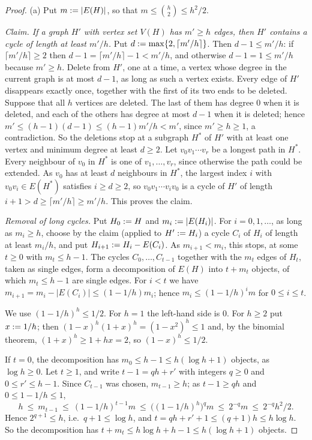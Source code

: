 \begin{proof}
(a) Put $m\mathrel{:=}|E(H)|$, so that $m\le\binom h2\le h^2/2$.

\emph{Claim. If a graph $H'$ with vertex set $V(H)$ has $m'\ge h$ edges, then
$H'$ contains a cycle of length at least $m'/h$.} Put
$d\mathrel{:=}\max\{2,\lceil m'/h\rceil\}$. Then $d-1\le m'/h$: if
$\lceil m'/h\rceil\ge2$ then $d-1=\lceil m'/h\rceil-1<m'/h$, and otherwise
$d-1=1\le m'/h$ because $m'\ge h$. Delete from $H'$, one at a time, a vertex
whose degree in the current graph is at most $d-1$, as long as such a vertex
exists. Every edge of $H'$ disappears exactly once, together with the first of
its two ends to be deleted. Suppose that all $h$ vertices are deleted. The last
of them has degree $0$ when it is deleted, and each of the others has degree at
most $d-1$ when it is deleted; hence $m'\le(h-1)(d-1)\le(h-1)m'/h<m'$, since
$m'\ge h\ge1$, a contradiction. So the deletions stop at a subgraph $H^*$ of $H'$
with at least one vertex and minimum degree at least $d\ge2$. Let
$v_0v_1\cdots v_r$ be a longest path in $H^*$. Every neighbour of $v_0$ in $H^*$
is one of $v_1,\dots,v_r$, since otherwise the path could be extended. As $v_0$
has at least $d$ neighbours in $H^*$, the largest index $i$ with
$v_0v_i\in E(H^*)$ satisfies $i\ge d\ge2$, so $v_0v_1\cdots v_iv_0$ is a cycle of
$H'$ of length $i+1>d\ge\lceil m'/h\rceil\ge m'/h$. This proves the claim.

\emph{Removal of long cycles.} Put $H_0\mathrel{:=} H$ and $m_i\mathrel{:=}|E(H_i)|$. For
$i=0,1,\dots$, as long as $m_i\ge h$, choose by the claim (applied to
$H'\mathrel{:=} H_i$) a cycle $C_i$ of $H_i$ of length at least $m_i/h$, and put
$H_{i+1}\mathrel{:=} H_i-E(C_i)$. As $m_{i+1}<m_i$, this stops, at some $t\ge0$ with
$m_t\le h-1$. The cycles $C_0,\dots,C_{t-1}$ together with the $m_t$ edges of
$H_t$, taken as single edges, form a decomposition of $E(H)$ into $t+m_t$
objects, of which $m_t\le h-1$ are single edges. For $i<t$ we have
$m_{i+1}=m_i-|E(C_i)|\le(1-1/h)m_i$; hence $m_i\le(1-1/h)^im$ for $0\le i\le t$.

We use $(1-1/h)^h\le1/2$. For $h=1$ the left-hand side is $0$. For $h\ge2$ put
$x\mathrel{:=}1/h$; then $(1-x)^h(1+x)^h=(1-x^2)^h\le1$ and, by the binomial theorem,
$(1+x)^h\ge1+hx=2$, so $(1-x)^h\le1/2$.

If $t=0$, the decomposition has $m_0\le h-1\le h(\log h+1)$ objects, as
$\log h\ge0$. Let $t\ge1$, and write $t-1=qh+r'$ with integers $q\ge0$ and
$0\le r'\le h-1$. Since $C_{t-1}$ was chosen, $m_{t-1}\ge h$; as $t-1\ge qh$ and
$0\le1-1/h\le1$,
\[
h\ \le\ m_{t-1}\ \le\ (1-1/h)^{t-1}m\ \le\ \bigl((1-1/h)^h\bigr)^qm\ \le\ 2^{-q}m\
\le\ 2^{-q}h^2/2 .
\]
Hence $2^{q+1}\le h$, i.e.\ $q+1\le\log h$, and $t=qh+r'+1\le(q+1)h\le h\log h$.
So the decomposition has $t+m_t\le h\log h+h-1\le h(\log h+1)$ objects.


\end{proof}
